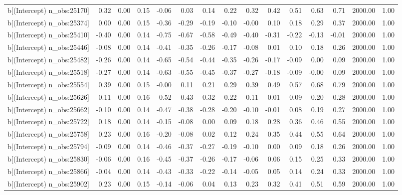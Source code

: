 \begin{table}[ht]
\begin{tabular}{rrrrrrrrrrrrrrr}
  b[(Intercept) n\_obs:25170] & 0.32 & 0.00 & 0.15 & -0.06 & 0.03 & 0.14 & 0.22 & 0.32 & 0.42 & 0.51 & 0.63 & 0.71 & 2000.00 & 1.00 \\ 
  b[(Intercept) n\_obs:25374] & 0.00 & 0.00 & 0.15 & -0.36 & -0.29 & -0.19 & -0.10 & -0.00 & 0.10 & 0.18 & 0.29 & 0.37 & 2000.00 & 1.00 \\ 
  b[(Intercept) n\_obs:25410] & -0.40 & 0.00 & 0.14 & -0.75 & -0.67 & -0.58 & -0.49 & -0.40 & -0.31 & -0.22 & -0.13 & -0.01 & 2000.00 & 1.00 \\ 
  b[(Intercept) n\_obs:25446] & -0.08 & 0.00 & 0.14 & -0.41 & -0.35 & -0.26 & -0.17 & -0.08 & 0.01 & 0.10 & 0.18 & 0.26 & 2000.00 & 1.00 \\ 
  b[(Intercept) n\_obs:25482] & -0.26 & 0.00 & 0.14 & -0.65 & -0.54 & -0.44 & -0.35 & -0.26 & -0.17 & -0.09 & 0.00 & 0.09 & 2000.00 & 1.00 \\ 
  b[(Intercept) n\_obs:25518] & -0.27 & 0.00 & 0.14 & -0.63 & -0.55 & -0.45 & -0.37 & -0.27 & -0.18 & -0.09 & -0.00 & 0.09 & 2000.00 & 1.00 \\ 
  b[(Intercept) n\_obs:25554] & 0.39 & 0.00 & 0.15 & -0.00 & 0.11 & 0.21 & 0.29 & 0.39 & 0.49 & 0.57 & 0.68 & 0.79 & 2000.00 & 1.00 \\ 
  b[(Intercept) n\_obs:25626] & -0.11 & 0.00 & 0.16 & -0.52 & -0.43 & -0.32 & -0.22 & -0.11 & -0.01 & 0.09 & 0.20 & 0.28 & 2000.00 & 1.00 \\ 
  b[(Intercept) n\_obs:25662] & -0.10 & 0.00 & 0.14 & -0.47 & -0.38 & -0.28 & -0.20 & -0.10 & -0.01 & 0.08 & 0.19 & 0.27 & 2000.00 & 1.00 \\ 
  b[(Intercept) n\_obs:25722] & 0.18 & 0.00 & 0.14 & -0.15 & -0.08 & 0.00 & 0.09 & 0.18 & 0.28 & 0.36 & 0.46 & 0.55 & 2000.00 & 1.00 \\ 
  b[(Intercept) n\_obs:25758] & 0.23 & 0.00 & 0.16 & -0.20 & -0.08 & 0.02 & 0.12 & 0.24 & 0.35 & 0.44 & 0.55 & 0.64 & 2000.00 & 1.00 \\ 
  b[(Intercept) n\_obs:25794] & -0.09 & 0.00 & 0.14 & -0.46 & -0.37 & -0.27 & -0.19 & -0.10 & 0.00 & 0.09 & 0.18 & 0.26 & 2000.00 & 1.00 \\ 
  b[(Intercept) n\_obs:25830] & -0.06 & 0.00 & 0.16 & -0.45 & -0.37 & -0.26 & -0.17 & -0.06 & 0.06 & 0.15 & 0.25 & 0.33 & 2000.00 & 1.00 \\ 
  b[(Intercept) n\_obs:25866] & -0.04 & 0.00 & 0.14 & -0.43 & -0.33 & -0.22 & -0.14 & -0.05 & 0.05 & 0.14 & 0.24 & 0.33 & 2000.00 & 1.00 \\ 
  b[(Intercept) n\_obs:25902] & 0.23 & 0.00 & 0.15 & -0.14 & -0.06 & 0.04 & 0.13 & 0.23 & 0.32 & 0.41 & 0.51 & 0.59 & 2000.00 & 1.00 \\ 

\end{tabular}
\end{table}
